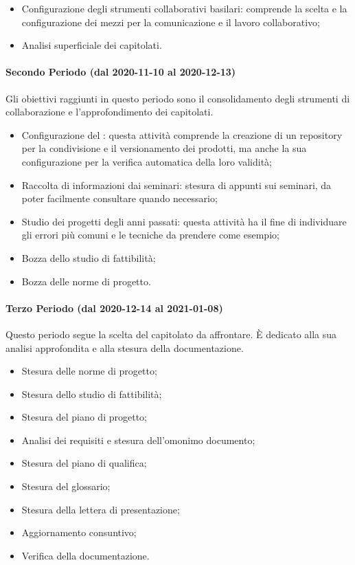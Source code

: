\begin{itemize}
	\item Configurazione degli strumenti collaborativi basilari: comprende la scelta e la configurazione dei mezzi per la comunicazione e il lavoro collaborativo;
	\item Analisi superficiale dei capitolati.
	
\end{itemize}

\paragraph{Secondo Periodo (dal 2020-11-10 al 2020-12-13)}
Gli obiettivi raggiunti in questo periodo sono il consolidamento degli strumenti di collaborazione e l'approfondimento dei capitolati.
\begin{itemize}
	\item Configurazione del : questa attività comprende la creazione di un repository per la condivisione e il versionamento dei prodotti, ma anche la sua configurazione per la verifica automatica della loro validità;
	\item Raccolta di informazioni dai seminari: stesura di appunti sui seminari, da poter facilmente consultare quando necessario;
	\item Studio dei progetti degli anni passati: questa attività ha il fine di individuare gli errori più comuni e le tecniche da prendere come esempio;
	\item Bozza dello studio di fattibilità;
	\item Bozza delle norme di progetto.
\end{itemize}

\paragraph{Terzo Periodo (dal 2020-12-14 al 2021-01-08)}
Questo periodo segue la scelta del capitolato da affrontare. È dedicato alla sua analisi approfondita e alla stesura della documentazione. 
\begin{itemize}
	\item Stesura delle norme di progetto;
	\item Stesura dello studio di fattibilità;
	\item Stesura del piano di progetto;
	\item Analisi dei requisiti e stesura dell'omonimo documento;
	\item Stesura del piano di qualifica;
	\item Stesura del glossario;
	\item Stesura della lettera di presentazione;
	\item Aggiornamento consuntivo;
	\item Verifica della documentazione.
\end{itemize}

